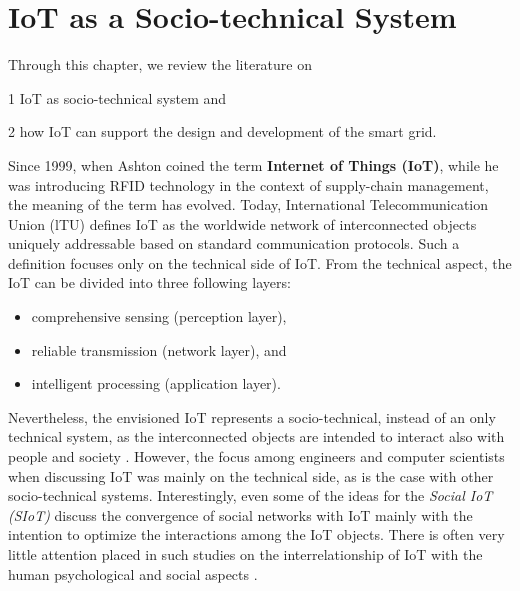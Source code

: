 \section{IoT as a Socio-technical System}
\label{sec:IoT_socio-techical}

\begin{svgraybox}
	Through this chapter, we review the literature on
	
	1 IoT as socio-technical system and
	
	2 how IoT can support the design and development of the smart grid.
\end{svgraybox}

Since 1999, when Ashton \cite{ashton2011internet} coined the term \textbf{Internet of Things (IoT)}, while he was introducing RFID technology in the context of supply-chain management, the meaning of the term has evolved. Today, International Telecommunication Union (lTU) defines IoT as the worldwide network of interconnected objects uniquely addressable based on standard communication protocols. Such a definition focuses only on the technical side of IoT. From the technical aspect, the IoT can be divided into three following layers:
\begin{itemize}
	\item comprehensive sensing (perception layer),
	\item reliable transmission (network layer), and
	\item intelligent processing (application layer).
\end{itemize}
Nevertheless, the envisioned IoT represents a socio-technical, instead of an only technical system, as the interconnected objects are intended to interact also with people and society \cite{atzori2014smart,Shin2014}. 
However, the focus among engineers and computer scientists when discussing IoT was mainly on the technical side, as is the case with other socio-technical systems.
Interestingly, even some of the ideas for the \textit{Social IoT (SIoT)} \cite{atzori2012social,guinard2010sharing,atzori2014smart} discuss the convergence of social networks with IoT mainly with the intention to optimize the interactions among the IoT objects. There is often very little attention placed in such studies on the interrelationship of IoT with the human psychological and social aspects \cite{atzori2012social,guinard2010sharing}. 

